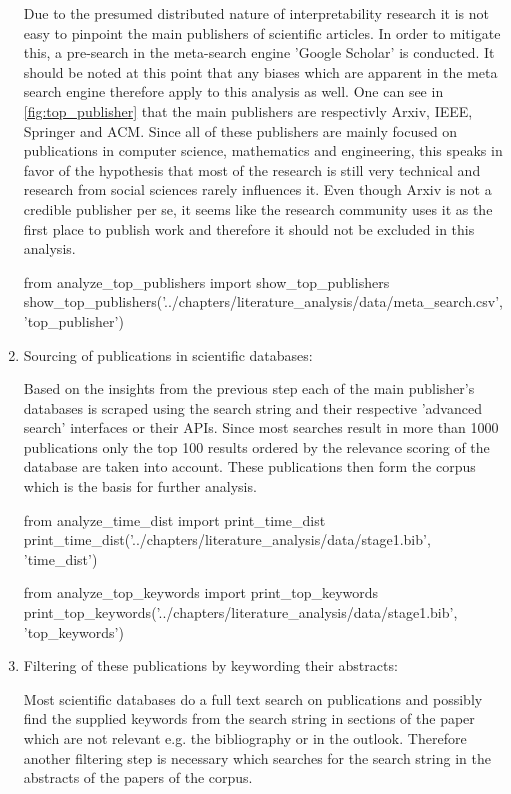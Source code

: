 \begin{enumerate}
	Due to the presumed distributed nature of interpretability research it is not easy to pinpoint the main publishers of scientific articles. In order to mitigate this, a pre-search in the meta-search engine 'Google Scholar' is conducted. It should be noted at this point that any biases which are apparent in the meta search engine therefore apply to this analysis as well. One can see in \autoref{fig:top_publisher} that the main publishers are respectivly Arxiv, IEEE, Springer and ACM. Since all of these publishers are mainly focused on publications in computer science, mathematics and engineering, this speaks in favor of the hypothesis that most of the research is still very technical and research from social sciences rarely influences it. Even though Arxiv is not a credible publisher per se, it seems like the research community uses it as the first place to publish work and therefore it should not be excluded in this analysis. 
	
\begin{pycode}
from analyze_top_publishers import show_top_publishers
show_top_publishers('../chapters/literature_analysis/data/meta_search.csv', 'top_publisher')
\end{pycode}

	\item Sourcing of publications in scientific databases:
	
	Based on the insights from the previous step each of the main publisher's databases is scraped using the search string and their respective 'advanced search' interfaces or their APIs. Since most searches result in more than 1000 publications only the top 100 results ordered by the relevance scoring of the database are taken into account. These publications then form the corpus which is the basis for further analysis.

\begin{pycode}
from analyze_time_dist import print_time_dist
print_time_dist('../chapters/literature_analysis/data/stage1.bib', 'time_dist')
\end{pycode}

\begin{pycode}
from analyze_top_keywords import print_top_keywords
print_top_keywords('../chapters/literature_analysis/data/stage1.bib', 'top_keywords')
\end{pycode}
	
	\item Filtering of these publications by keywording their abstracts:
	
	Most scientific databases do a full text search on publications and possibly find the supplied keywords from the search string in sections of the paper which are not relevant e.g. the bibliography or in the outlook. Therefore another filtering step is necessary which searches for the search string in the abstracts of the papers of the corpus.
	

\end{enumerate}
